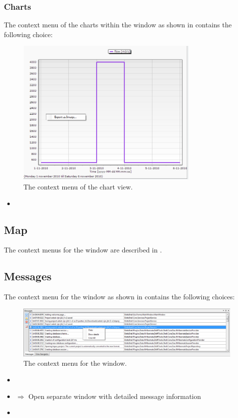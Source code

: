 \subsubsection{Charts}
\label{subsubsec:charts}
The context menu of the charts within the  window as shown in  contains the following choice: 
%
\begin{figure} [H]
	\centering
		\includegraphics[width=0.8\textwidth]{Figures/Chapter_overview/context_menu_chart.png}
	\caption{The context menu of the chart view.}
	\label{fig:contextmenuchart}
\end{figure}
\begin{itemize}
	\item {}
\end{itemize}
\subsection{Map}
\label{subsec:map}
The context menus for the  window are described in .
%
\subsection{Messages}
\label{subsec:messages2}
The context menu for the  window as shown in  contains the following choices: 
%
\begin{figure} [H]
	\centering
		\includegraphics[width=\textwidth]{Figures/Chapter_overview/context_menu_messages.png}
	\caption{The context menu for the  window.}
	\label{fig:contextmenumessages}
\end{figure}
\begin{itemize}
	\item {}
	\item {} $\Rightarrow$ Open separate window with detailed message information
	\item {}
\end{itemize}


